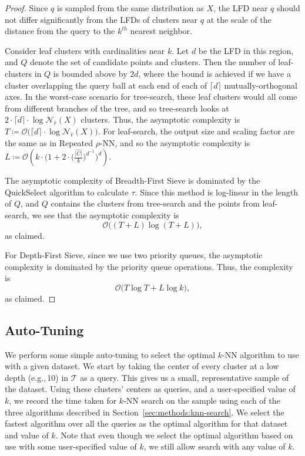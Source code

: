\begin{proof}
Since $q$ is sampled from the same distribution as $X$, the LFD near $q$ should not differ significantly from the LFDs of clusters near $q$ at the scale of the distance from the query to the $k^{th}$ nearest neighbor.

Consider leaf clusters with cardinalities near $k$. Let $d$ be the LFD in this region, and $Q$ denote the set of candidate points and clusters.
Then the number of leaf-clusters in $Q$ is bounded above by $2d$, where the bound is achieved if we have a cluster overlapping the query ball at each end of each of $\lceil d \rceil$ mutually-orthogonal axes.
In the worst-case scenario for tree-search, these leaf clusters would all come from different branches of the tree, and so tree-search looks at $2 \cdot \lceil d \rceil \cdot \log \mathcal{N}_{\hat{r}}(X)$ clusters.
Thus, the asymptotic complexity is $T \coloneqq \mathcal{O} \big( \lceil d \rceil \cdot \log \mathcal{N}_{\hat{r}}(X) \big)$.
For leaf-search, the output size and scaling factor are the same as in Repeated $\rho$-NN, and so the asymptotic complexity is $L \coloneqq \mathcal{O} \left( k \cdot \bigg( 1 + 2 \cdot \Big( \frac{\hat{|C|}}{k} \Big) ^ {d^{-1}} \bigg)^d \right)$.

The asymptotic complexity of Breadth-First Sieve is dominated by the QuickSelect algorithm to calculate $\tau$.
Since this method is log-linear in the length of $Q$, and $Q$ contains the clusters from tree-search and the points from leaf-search, we see that the asymptotic complexity is
\begin{equation*}
    \mathcal{O} \Big( (T + L ) \log (T + L ) \Big),
\end{equation*} as claimed.

For Depth-First Sieve, since we use two priority queues, the asymptotic complexity is dominated by the priority queue operations.
Thus, the complexity is
\begin{equation*}
    \mathcal{O} \Big( T \log T + L \log k \Big),
\end{equation*} as claimed.
\end{proof}

\subsection{Auto-Tuning}
\label{sec:methods:auto-tuning}

We perform some simple auto-tuning to select the optimal $k$-NN algorithm to use with a given dataset.
We start by taking the center of every cluster at a low depth (e.g.,\,10) in $\mathcal{T}$ as a query.
This gives us a small, representative sample of the dataset.
Using these clusters' centers as queries, and a user-specified value of $k$, we record the time taken for $k$-NN search on the sample using each of the three algorithms described in Section~\ref{sec:methods:knn-search}.
We select the fastest algorithm over all the queries as the optimal algorithm for that dataset and value of $k$.
Note that even though we select the optimal algorithm based on use with some user-specified value of $k$, we still allow search with any value of $k$.


